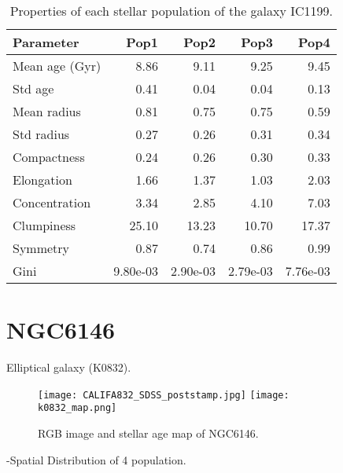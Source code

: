 \begin{table}[h]
\centering
\begin{tabular}{l|r|r|r|r}
Parameter & Pop1 & Pop2 & Pop3 & Pop4 \\\hline
Mean age (Gyr) & 8.86 & 9.11 & 9.25 & 9.45 \\
Std age & 0.41 & 0.04 & 0.04 & 0.13 \\
Mean radius & 0.81 & 0.75 & 0.75 & 0.59 \\
Std radius & 0.27 & 0.26 & 0.31 & 0.34 \\
Compactness & 0.24 & 0.26 & 0.30 & 0.33 \\
Elongation & 1.66 & 1.37 & 1.03 & 2.03 \\
Concentration & 3.34 & 2.85 & 4.10 & 7.03 \\
Clumpiness & 25.10 & 13.23 & 10.70 & 17.37 \\
Symmetry & 0.87 & 0.74 & 0.86 & 0.99 \\
Gini & 9.80e-03 & 2.90e-03 & 2.79e-03 & 7.76e-03 \\
\end{tabular}
\caption{\label{tab:widgets}Properties of each stellar population of the galaxy IC1199.}
\end{table}



\newpage
\section*{NGC6146}
Elliptical galaxy (K0832).

\begin{figure}[bh]
\begin{center}
\texttt{[image: CALIFA832\_SDSS\_poststamp.jpg]}
\texttt{[image: k0832\_map.png]}
\caption{RGB image and stellar age map of NGC6146.}
   \label{fig1}
\end{center}
\end{figure}

-Spatial Distribution of 4 population.


